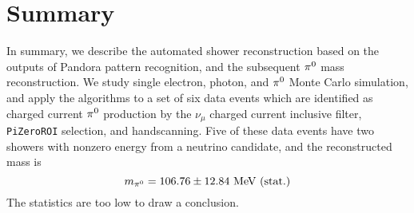 \section{Summary}
\label{sec:summary}

In summary, we describe the automated shower reconstruction based 
on the outputs of Pandora pattern recognition,
and the subsequent ${\pi}^0$ mass reconstruction.
We study single electron, photon, and ${\pi}^0$ Monte Carlo
simulation, and apply the algorithms to a set of six data events
which are identified as charged current ${\pi}^0$ production
by the $\nu_{\mu}$ charged current inclusive filter,
\texttt{PiZeroROI} selection, and handscanning.
Five of these data events have two showers with nonzero energy
from a neutrino candidate, and the reconstructed mass is
\begin{equation}
\label{eq:pi0_mass_result}
m_{{\pi}^0} = 106.76\pm 12.84~\mbox{MeV (stat.)}
\end{equation}
The statistics are too low to draw a conclusion.
